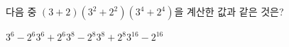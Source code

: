 다음 중 $(3+2)(3^2+2^2)(3^4+2^4)$을 계산한 값과 같은 것은?
\begin{choices32}{$3^6-2^6$}{$3^6+2^6$}{$3^8-2^8$}{$3^8+2^8$}{$3^{16}-2^{16}$}\end{choices32}
